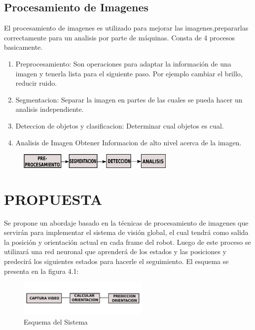 \documentclass[conference]{IEEEtran}
\begin{document}
 \subsection{Procesamiento de Imagenes}
El procesamiento de imagenes es utilizado para mejorar las imagenes,prepararlas correctamente para un analisis por parte de m\'aquinas. Consta de 4 procesos basicamente.\cite{art_red1}
\begin{enumerate}
\item Preprocesamiento: Son operaciones para adaptar la informaci\'on de una imagen y tenerla lista para el siguiente paso. Por ejemplo cambiar el brillo, reducir ruido.
\item Segmentacion: Separar la imagen en partes de las cuales se pueda hacer un analisis independiente.
\item Deteccion de objetos y clasificacion: Determinar cual objetos es cual.
\item Analisis de Imagen Obtener Informacion de alto nivel acerca de la imagen.
\end{enumerate}
 \begin{figure}
	\centering
	\includegraphics[width=3.0in]{imagen5.pdf}
	
\end{figure}
\section{PROPUESTA}
Se propone un abordaje basado en la t\'ecnicas de procesamiento de imagenes que servir\'an para implementar el sistema de visi\'on global, el cual tendr\'a como salida la posici\'on y orientaci\'on actual en cada frame del robot. Luego de este proceso se utilizar\'a una red neuronal  que aprender\'a de los estados y las posiciones y predecir\'a los siguientes estados para hacerle el seguimiento. El esquema se presenta en la figura 4.1: \\
	\begin{figure}
	\centering
	\includegraphics[width=2.5in]{esquema.pdf}
	
	\caption{Esquema del Sistema}
	\label{fig_mar}
\end{figure}
\end{document}
